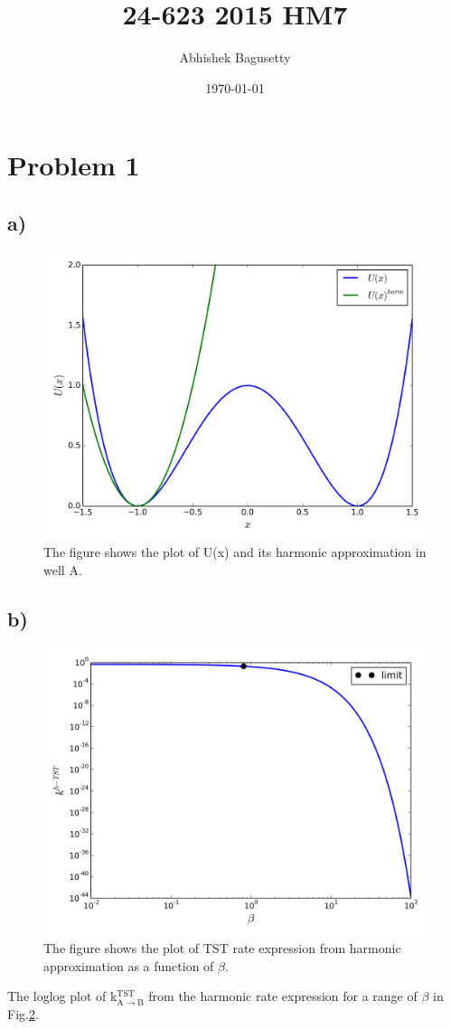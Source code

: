 \documentclass{article}
\author{Abhishek Bagusetty}
\date{\today}
\title{24-623 2015 HM7}
\begin{document}
\maketitle

\section{Problem 1}
\label{sec-1}
\subsection{a)}
\label{sec-1-1}
\begin{figure}[htb]
\centering
\includegraphics[width=.9\linewidth]{./P1/P1-a.png}
\caption{\label{fig:P1-a}The figure shows the plot of U(x) and its harmonic approximation in well A.}
\end{figure}

\subsection{b)}
\label{sec-1-2}
\begin{figure}[htb]
\centering
\includegraphics[width=.9\linewidth]{./P1/P1-b.png}
\caption{\label{fig:P1-b}The figure shows the plot of TST rate expression from harmonic approximation as a function of $\beta$.}
\end{figure}
The loglog plot of k$_{\text{A }\rightarrow\ \text{B}}^{\text{TST}}$ from the harmonic rate expression for a range of $\beta$ in Fig.\ref{fig:P1-b}.
\end{document}
